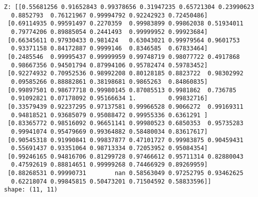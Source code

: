 \documentclass[11pt]{article}
\begin{document}
    \begin{Verbatim}[commandchars=\\\{\}]
Z: [[0.55681256 0.91652843 0.99378656 0.31947235 0.65721304 0.23990623
  0.8852793  0.76121967 0.99994792 0.92242923 0.72450486]
 [0.69114935 0.99591497 0.2270359  0.99983899 0.99862038 0.51934011
  0.79774206 0.89885054 0.2441493  0.99999952 0.99923684]
 [0.66345611 0.97930433 0.981424   0.63043021 0.99979564 0.9601753
  0.93371158 0.84172887 0.9999146  0.8346585  0.67833464]
 [0.2485546  0.99995437 0.99999959 0.99748719 0.98077722 0.4917868
  0.98667356 0.94501794 0.87994106 0.95782474 0.59783452]
 [0.92274932 0.70952536 0.98992208 0.80128185 0.8823722  0.98302992
  0.09585266 0.88882861 0.38198681 0.9865263  0.84860835]
 [0.99897501 0.98677718 0.99980145 0.87085513 0.9981862  0.736785
  0.91092821 0.07178092 0.95166634 1.         0.99832716]
 [0.33579439 0.92237295 0.97137581 0.99966528 0.9066272  0.99169311
  0.94818521 0.93685079 0.95088472 0.99955336 0.6361291 ]
 [0.83365772 0.98516092 0.96651141 0.99980523 0.6850353  0.95735283
  0.99941074 0.95479669 0.99364882 0.58480034 0.83617617]
 [0.90545318 0.91990841 0.99837877 0.47101727 0.99983875 0.90459431
  0.55691437 0.93351064 0.98713334 0.72053952 0.95084354]
 [0.99246165 0.94816706 0.81299728 0.97466612 0.95711314 0.82880043
  0.47592619 0.88814651 0.99999268 0.74466929 0.89269959]
 [0.88268531 0.99990731        nan 0.58563049 0.97252795 0.93462625
  0.62218074 0.99845815 0.50473201 0.71504592 0.58833596]]
shape: (11, 11)

    \end{Verbatim}

    \begin{center}
    \end{center}
    { \hspace*{\fill} \\}
    

    
    
    
    
\end{document}
